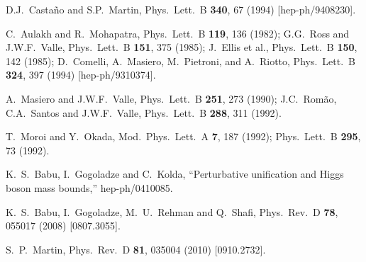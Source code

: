 \documentclass[12pt]{article}
\begin{document}
\begin{thebibliography}{999}
D.J.~Casta\~no and S.P.~Martin,
  Phys.\ Lett.\ B {\bf 340}, 67 (1994)
  [hep-ph/9408230].

C.~Aulakh and R.~Mohapatra,
  Phys.\ Lett.\ B {\bf 119}, 136 (1982);
G.G.~Ross and J.W.F.~Valle,
  Phys.\ Lett.\ B {\bf 151}, 375 (1985);
J.~Ellis et al.,
  Phys.\ Lett.\ B {\bf 150}, 142 (1985);
D.~Comelli, A.~Masiero, M.~Pietroni, and A.~Riotto, 
  Phys.\ Lett.\ B {\bf 324}, 397 (1994)
  [hep-ph/9310374].

A.~Masiero and J.W.F.~Valle, 
  Phys.\ Lett.\ B {\bf 251}, 273 (1990);
J.C.~Rom\~ao, C.A.~Santos and J.W.F.~Valle,
  Phys.\ Lett.\ B {\bf 288}, 311 (1992).

  T.~Moroi and Y.~Okada,
  Mod.\ Phys.\ Lett.\ A {\bf 7}, 187 (1992);
  Phys.\ Lett.\ B {\bf 295}, 73 (1992).
  
  K.~S.~Babu, I.~Gogoladze and C.~Kolda,
  ``Perturbative unification and Higgs boson mass bounds,''
  hep-ph/0410085.

  K.~S.~Babu, I.~Gogoladze, M.~U.~Rehman and Q.~Shafi,
  Phys.\ Rev.\ D {\bf 78}, 055017 (2008)
  [0807.3055].

  S.~P.~Martin,
  Phys.\ Rev.\ D {\bf 81}, 035004 (2010)
  [0910.2732].


\end{thebibliography}
\end{document}
